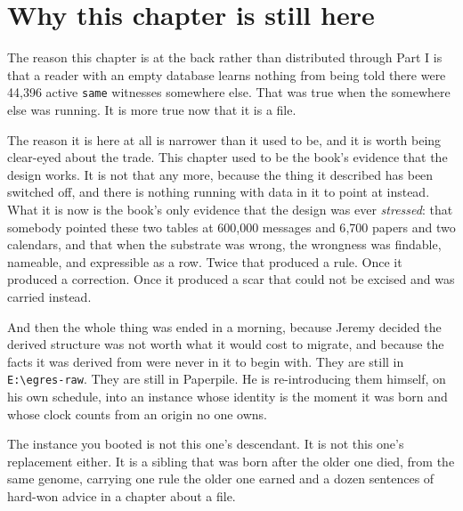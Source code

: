 \section{Why this chapter is still here}

The reason this chapter is at the back rather than distributed through Part I is that a reader with an empty database learns nothing from being told there were 44{,}396 active \texttt{same} witnesses somewhere else. That was true when the somewhere else was running. It is more true now that it is a file.

The reason it is here at all is narrower than it used to be, and it is worth being clear-eyed about the trade. This chapter used to be the book's evidence that the design works. It is not that any more, because the thing it described has been switched off, and there is nothing running with data in it to point at instead. What it is now is the book's only evidence that the design was ever \emph{stressed}: that somebody pointed these two tables at 600{,}000 messages and 6{,}700 papers and two calendars, and that when the substrate was wrong, the wrongness was findable, nameable, and expressible as a row. Twice that produced a rule. Once it produced a correction. Once it produced a scar that could not be excised and was carried instead.

And then the whole thing was ended in a morning, because Jeremy decided the derived structure was not worth what it would cost to migrate, and because the facts it was derived from were never in it to begin with. They are still in \texttt{E:\textbackslash egres-raw}. They are still in Paperpile. He is re-introducing them himself, on his own schedule, into an instance whose identity is the moment it was born and whose clock counts from an origin no one owns.

The instance you booted is not this one's descendant. It is not this one's replacement either. It is a sibling that was born after the older one died, from the same genome, carrying one rule the older one earned and a dozen sentences of hard-won advice in a chapter about a file.
